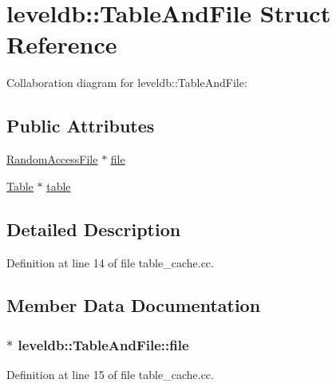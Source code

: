 \hypertarget{structleveldb_1_1_table_and_file}{}\section{leveldb\+:\+:Table\+And\+File Struct Reference}
\label{structleveldb_1_1_table_and_file}


Collaboration diagram for leveldb\+:\+:Table\+And\+File\+:
\subsection*{Public Attributes}
\begin{DoxyCompactItemize}
\item 
\hyperlink{classleveldb_1_1_random_access_file}{Random\+Access\+File} $\ast$ \hyperlink{structleveldb_1_1_table_and_file_a7f1f72d4654e4ab49aab750330036edb}{file}
\item 
\hyperlink{classleveldb_1_1_table}{Table} $\ast$ \hyperlink{structleveldb_1_1_table_and_file_ab2df8b8a6c028cfcf36885fe76f48c99}{table}
\end{DoxyCompactItemize}


\subsection{Detailed Description}


Definition at line 14 of file table\+\_\+cache.\+cc.



\subsection{Member Data Documentation}
\hypertarget{structleveldb_1_1_table_and_file_a7f1f72d4654e4ab49aab750330036edb}{}
\subsubsection[{file}]{$\ast$ leveldb\+::\+Table\+And\+File\+::file}\label{structleveldb_1_1_table_and_file_a7f1f72d4654e4ab49aab750330036edb}


Definition at line 15 of file table\+\_\+cache.\+cc.

\hypertarget{structleveldb_1_1_table_and_file_ab2df8b8a6c028cfcf36885fe76f48c99}{}
